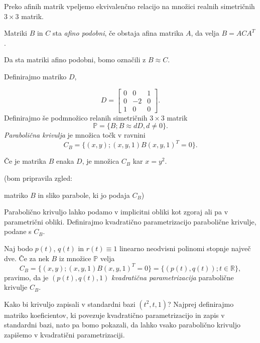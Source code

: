 \documentclass[mat1]{fmfdelo}
\newcommand{\R}{\mathbb R}
\newcommand{\PP}{\mathbb P}
\begin{document}

Preko afinih matrik vpeljemo ekvivalenčno relacijo na množici realnih simetričnih $3 \times 3$ matrik.

\begin{definicija}
Matriki $B$ in $C$ sta \emph{afino podobni}, če obstaja afina matrika $A$, da velja $B = A C A^{T}$.
\end{definicija}

Da sta matriki afino podobni, bomo označili z $B \approx C$. 


\begin{definicija}
Definirajmo matriko $D$, 

$$D = 
\begin{bmatrix}
0 & 0 & 1 \\
0 & -2 & 0 \\
1 & 0 & 0
\end{bmatrix}.
$$
Definirajmo še podmnožico relanih simetričnih $3 \times 3$ matrik $$\PP = \{ B; B \approx d D, d \neq 0 \} .$$
\emph{Parabolična krivulja} je množica točk v ravnini $$ C_B = \{ (x,y); (x,y,1) B (x, y, 1)^T = 0 \}.$$
\end{definicija}

Če je matrika $B$ enaka $D$, je množica $C_B$ kar $x = y^2$.

\begin{zgled}

(bom pripravila zgled: 

matriko $B$ in sliko parabole, ki jo podaja $C_B$)

\end{zgled}

Parabolično krivuljo lahko podamo v implicitni obliki kot zgoraj ali pa v parametrični obliki. Definirajmo kvadratično parametrizacijo parabolične krivulje, podane s $C_B$.

\begin{definicija}
Naj bodo $p(t)$, $q(t)$ in $r(t) \equiv 1$ linearno neodvisni polinomi stopnje največ dve. Če za nek $B$ iz množice $\PP$ velja 
$$ C_B = \{ (x,y); (x,y,1) B (x, y, 1)^T = 0 \} = \{ (p(t), q(t)); t \in \R \},$$
pravimo, da je $( p(t), q(t), 1)$ \emph{kvadratična parametrizacija} parabolične krivulje $C_B$.
\end{definicija}

Kako bi krivuljo zapisali v standardni bazi $(t^2, t, 1)$? Najprej definirajmo matriko koeficientov, ki povezuje kvadratično parametrizacijo in zapis v standardni bazi, nato pa bomo pokazali, da lahko vsako parabolično krivuljo zapišemo v kvadratični parametrizaciji.
\end{document}
